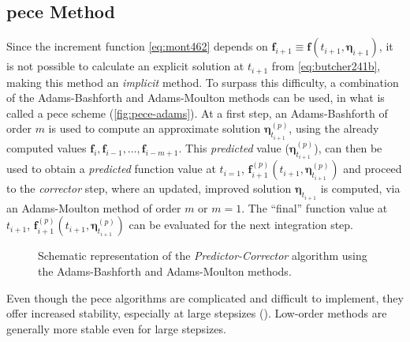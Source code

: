 \subsection{\gls{pece} Method}\label{ssec:predictor-corrector-method}

Since the increment function \autoref{eq:mont462} depends on 
$\bm{f}_{i+1} \equiv \bm{f}(t_{i+1}, \bm{\eta}_{i+1})$, it is not possible to 
calculate an explicit solution at $t_{i+1}$ from \autoref{eq:butcher241b}, 
making this method an \emph{implicit} method. To surpass this difficulty, a combination 
of the Adams-Bashforth and Adams-Moulton methods can be used, in what is called a 
\gls{pece} scheme (\autoref{fig:pece-adams}). 
At a first step, an Adams-Bashforth of order $m$ is used to compute an approximate 
solution $\bm{\eta}^{(p)}_{t_{i+1}}$, using the already computed values 
$\bm{f}_i, \bm{f}_{i-1}, \dots , \bm{f}_{i-m+1}$. This \emph{predicted} value 
($\bm{\eta}^{(p)}_{t_{i+1}}$), can then be used to obtain a \emph{predicted} 
function value at $t_{i=1}$, $\bm{f}^{(p)}_{i+1}(t_{i+1},\bm{\eta}^{(p)}_{t_{i+1}})$ 
and proceed to the \emph{corrector} step, where an updated, improved solution 
$\bm{\eta}_{t_{i+1}}$ is computed, via an Adams-Moulton method of order $m$ or 
$m=1$. The ``final'' function value at $t_{i+1}$, 
$\bm{f}^{(p)}_{i+1}(t_{i+1},\bm{\eta}^{(p)}_{t_{i+1}})$ can be evaluated for the 
next integration step.

\begin{figure}
  \centering
  
  \caption{Schematic representation of the \emph{Predictor-Corrector} algorithm using the Adams-Bashforth and Adams-Moulton methods.}
  \label{fig:pece-adams}
\end{figure}

Even though the \gls{pece} algorithms are complicated and difficult to implement, 
they offer increased stability, especially at large stepsizes (\cite{Montenbruck2000}).
Low-order methods are generally more stable even for large stepsizes.
